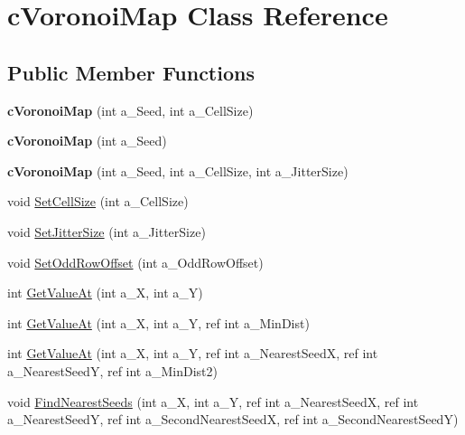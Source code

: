 \hypertarget{classc_voronoi_map}{}\section{c\+Voronoi\+Map Class Reference}
\label{classc_voronoi_map}
\subsection*{Public Member Functions}
\begin{DoxyCompactItemize}
\item 
\mbox{\label{classc_voronoi_map_a9b450ab8f0bcc1fbb80a9c9583157faf}} 
{\bfseries c\+Voronoi\+Map} (int a\+\_\+\+Seed, int a\+\_\+\+Cell\+Size)
\item 
\mbox{\label{classc_voronoi_map_a809169452b3942fcf3f2716b0a215c78}} 
{\bfseries c\+Voronoi\+Map} (int a\+\_\+\+Seed)
\item 
\mbox{\label{classc_voronoi_map_a9be89da217e8252b90de1e11407ea467}} 
{\bfseries c\+Voronoi\+Map} (int a\+\_\+\+Seed, int a\+\_\+\+Cell\+Size, int a\+\_\+\+Jitter\+Size)
\item 
void \hyperlink{classc_voronoi_map_a8764d5ec75eb46d721d10f9d4369bfb9}{Set\+Cell\+Size} (int a\+\_\+\+Cell\+Size)
\item 
void \hyperlink{classc_voronoi_map_ab9f95a3c7799d9010885145f19ce77b1}{Set\+Jitter\+Size} (int a\+\_\+\+Jitter\+Size)
\item 
void \hyperlink{classc_voronoi_map_a7c2196f0a071bb4f1ed9dbc82f42faed}{Set\+Odd\+Row\+Offset} (int a\+\_\+\+Odd\+Row\+Offset)
\item 
int \hyperlink{classc_voronoi_map_a33e0871361414e9485ce2f6b76e8aad2}{Get\+Value\+At} (int a\+\_\+X, int a\+\_\+Y)
\item 
int \hyperlink{classc_voronoi_map_ae9b7f43fdbdefbcc6345ffcd93972575}{Get\+Value\+At} (int a\+\_\+X, int a\+\_\+Y, ref int a\+\_\+\+Min\+Dist)
\item 
int \hyperlink{classc_voronoi_map_ae3363ea6fa041e1e59701173a9b26f34}{Get\+Value\+At} (int a\+\_\+X, int a\+\_\+Y, ref int a\+\_\+\+Nearest\+SeedX, ref int a\+\_\+\+Nearest\+SeedY, ref int a\+\_\+\+Min\+Dist2)
\item 
void \hyperlink{classc_voronoi_map_a133dc37d5d65b9568298853af3dfc0ae}{Find\+Nearest\+Seeds} (int a\+\_\+X, int a\+\_\+Y, ref int a\+\_\+\+Nearest\+SeedX, ref int a\+\_\+\+Nearest\+SeedY, ref int a\+\_\+\+Second\+Nearest\+SeedX, ref int a\+\_\+\+Second\+Nearest\+SeedY)
\end{DoxyCompactItemize}
